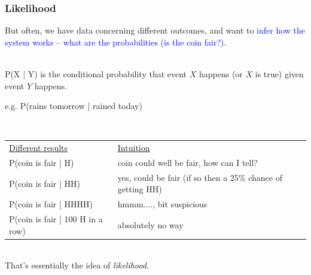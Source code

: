 \begin{frame}
\frametitle{Likelihood}

But often, we have \alert{data concerning different outcomes}, and want to
\textcolor{blue}{infer how the system works -- what are the probabilities (is
  the coin fair?)}.



~\\

P(X | Y) is the conditional probability that event $X$ happens (or $X$ is true) given event $Y$ happens.

e.g. P(rains tomorrow | rained today)

~\\



\begin{tabular}{ll}

\underline{Different results}  & \underline{Intuition}\\

P(coin is fair | H) & coin could well be fair, how can I tell? \\

\pause
P(coin is fair | HH) & yes, could be fair (if so then a 25\% chance of getting HH)\\
\pause

P(coin is fair | HHHH) & hmmm...., bit suspicious \\
\pause

P(coin is fair | 100 H in a row) & absolutely no way \\
\end{tabular}
\pause

~\\

That's essentially the idea of \alert{\emph{likelihood}}.

\end{frame}


%
%
%
%
%
%
%
%
%
%
%
%
%
%


